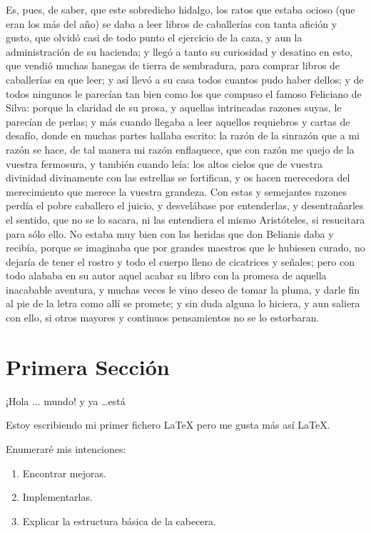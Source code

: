 \documentclass[12pt,
               spanish
              ]{article}
\begin{document}
\begin{flushleft}
Es, pues, de saber, que este sobredicho hidalgo, los ratos que estaba
ocioso (que eran los más del año) se daba a leer libros de caballerías
con tanta afición y gusto, que olvidó casi de todo punto el ejercicio
de la caza, y aun la administración de su hacienda; y llegó a tanto su
curiosidad y desatino en esto, que vendió muchas hanegas de tierra de
sembradura, para comprar libros de caballerías en que leer; y así
llevó a su casa todos cuantos pudo haber dellos; y de todos ningunos
le parecían tan bien como los que compuso el famoso Feliciano de
Silva: porque la claridad de su prosa, y aquellas intrincadas razones
suyas, le parecían de perlas; y más cuando llegaba a leer aquellos
requiebros y cartas de desafío, donde en muchas partes hallaba
escrito: la razón de la sinrazón que a mi razón se hace, de tal manera
mi razón enflaquece, que con razón me quejo de la vuestra fermosura, y
también cuando leía: los altos cielos que de vuestra divinidad
divinamente con las estrellas se fortifican, y os hacen merecedora del
merecimiento que merece la vuestra grandeza. Con estas y semejantes
razones perdía el pobre caballero el juicio, y desvelábase por
entenderlas, y desentrañarles el sentido, que no se lo sacara, ni las
entendiera el mismo Aristóteles, si resucitara para sólo ello. No
estaba muy bien con las heridas que don Belianis daba y recibía,
porque se imaginaba que por grandes maestros que le hubiesen curado,
no dejaría de tener el rostro y todo el cuerpo lleno de cicatrices y
señales; pero con todo alababa en su autor aquel acabar su libro con
la promesa de aquella inacabable aventura, y muchas veces le vino
deseo de tomar la pluma, y darle fin al pie de la letra como allí se
promete; y sin duda alguna lo hiciera, y aun saliera con ello, si
otros mayores y continuos pensamientos no se lo estorbaran.
\end{flushleft}

\section{Primera Sección}
\label{primeraSeccion}
¡Hola ... mundo! y ya \ldots está

Estoy escribiendo mi primer fichero LaTeX pero me gusta más así
\LaTeX.

Enumeraré mis intenciones:

\begin{enumerate}
\item Encontrar mejoras.
\item Implementarlas.
\item Explicar la estructura básica de la cabecera.\label{primera}
\end{enumerate}
\end{document}
